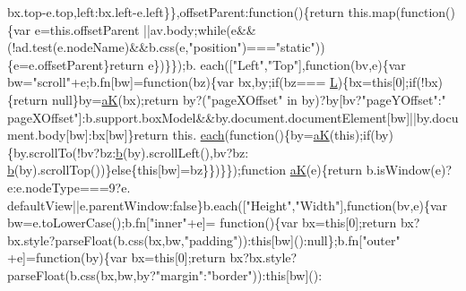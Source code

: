 \begin{DoxyCode}
      bx.top-e.top,left:bx.left-e.left\}\},offsetParent:\textcolor{keyword}{function}()\{\textcolor{keywordflow}{return} this.map(\textcolor{keyword}{function}()\{var e=this.offsetParent
      ||av.body;\textcolor{keywordflow}{while}(e&&(!ad.test(e.nodeName)&&b.css(e,\textcolor{stringliteral}{"position"})===\textcolor{stringliteral}{"static"}))\{e=e.offsetParent\}\textcolor{keywordflow}{return} e\})\}\});b.
      each([\textcolor{stringliteral}{"Left"},\textcolor{stringliteral}{"Top"}],\textcolor{keyword}{function}(bv,e)\{var bw=\textcolor{stringliteral}{"scroll"}+e;b.fn[bw]=\textcolor{keyword}{function}(bz)\{var bx,by;\textcolor{keywordflow}{if}(bz===
      \hyperlink{jquery_8js_a38ee4c0b5f4fe2a18d0c783af540d253}{L})\{bx=\textcolor{keyword}{this}[0];\textcolor{keywordflow}{if}(!bx)\{\textcolor{keywordflow}{return} null\}by=\hyperlink{jquery_8js_a7d370833f2145fc5f6c371e98d754eb4}{aK}(bx);\textcolor{keywordflow}{return} by?(\textcolor{stringliteral}{"pageXOffset"} in by)?by[bv?\textcolor{stringliteral}{"pageYOffset"}:\textcolor{stringliteral}{"
      pageXOffset"}]:b.support.boxModel&&by.document.documentElement[bw]||by.document.body[bw]:bx[bw]\}\textcolor{keywordflow}{return} this.
      \hyperlink{jquery_8js_a871ff39db627c54c710a3e9909b8234c}{each}(\textcolor{keyword}{function}()\{by=\hyperlink{jquery_8js_a7d370833f2145fc5f6c371e98d754eb4}{aK}(\textcolor{keyword}{this});\textcolor{keywordflow}{if}(by)\{by.scrollTo(!bv?bz:\hyperlink{jquery_8js_aa4026ad5544b958e54ce5e106fa1c805}{b}(by).scrollLeft(),bv?bz:
      \hyperlink{jquery_8js_aa4026ad5544b958e54ce5e106fa1c805}{b}(by).scrollTop())\}\textcolor{keywordflow}{else}\{\textcolor{keyword}{this}[bw]=bz\}\})\}\});\textcolor{keyword}{function} \hyperlink{jquery_8js_a7d370833f2145fc5f6c371e98d754eb4}{aK}(e)\{\textcolor{keywordflow}{return} b.isWindow(e)?e:e.nodeType===9?e.
      defaultView||e.parentWindow:\textcolor{keyword}{false}\}b.each([\textcolor{stringliteral}{"Height"},\textcolor{stringliteral}{"Width"}],\textcolor{keyword}{function}(bv,e)\{var bw=e.toLowerCase();b.fn[\textcolor{stringliteral}{"inner"}+e]=\textcolor{keyword}{
      function}()\{var bx=\textcolor{keyword}{this}[0];\textcolor{keywordflow}{return} bx?bx.style?parseFloat(b.css(bx,bw,\textcolor{stringliteral}{"padding"})):\textcolor{keyword}{this}[bw]():null\};b.fn[\textcolor{stringliteral}{"outer"}
      +e]=\textcolor{keyword}{function}(by)\{var bx=\textcolor{keyword}{this}[0];\textcolor{keywordflow}{return} bx?bx.style?parseFloat(b.css(bx,bw,by?\textcolor{stringliteral}{"margin"}:\textcolor{stringliteral}{"border"})):\textcolor{keyword}{this}[bw]():

\end{DoxyCode}
